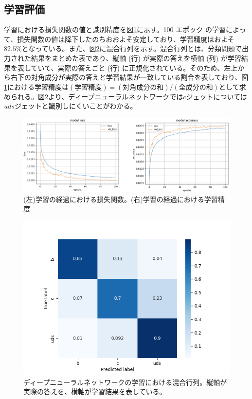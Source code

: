 \subsection{学習評価}
学習における損失関数の値と識別精度を図\ref{dnnoutput}に示す。100 エポック の学習によって、損失関数の値は降下したのちおおよそ安定しており、学習精度はおよそ$82.5\%$となっている。また、図\ref{dnncm}に混合行列を示す。混合行列とは、分類問題で出力された結果をまとめた表であり、縦軸 (行) が実際の答えを横軸 (列) が学習結果を表していて、実際の答えごと (行) に正規化されている。そのため、左上から右下の対角成分が実際の答えと学習結果が一致している割合を表しており、図\ref{dnnoutput}における学習精度は$(学習精度) = (対角成分の和) / (全成分の和)$として求められる。図\ref{dnncm}より、ディープニューラルネットワークでは$c$ジェットについては$uds$ジェットと識別しにくいことがわかる。\\
\begin{figure}[H]
	\begin{center}
 \includegraphics[keepaspectratio, scale=0.3]
 	{Figure/Flavortagging/dnnout.png}
 		\caption{(左)学習の経過における損失関数。(右)学習の経過における学習精度}
 		\label{dnnoutput}
	\end{center}
\end{figure}
\begin{figure}[H]
	\begin{center}
 \includegraphics[keepaspectratio, scale=0.5]
 	{Figure/Flavortagging/dnncm.png}
 		\caption{ディープニューラルネットワークの学習における混合行列。縦軸が実際の答えを、横軸が学習結果を表している。}
 		\label{dnncm}
	\end{center}
\end{figure}

